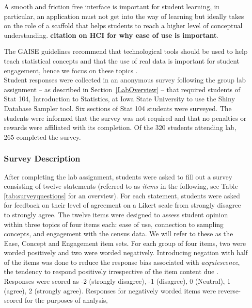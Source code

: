 \documentclass{article}\usepackage[]{graphicx}\usepackage[]{color}
\newcommand{\hh}[1]{{\color{ForestGreen} #1}}
\newcommand{\km}[1]{{\color{Orange} #1}}
\begin{document}
\hh{A smooth and friction free interface is important for student learning, in particular, an application must not get into the way of learning but ideally takes on the role of a scaffold that helps students to reach a higher level of conceptual understanding.}
\km{\textbf{citation on HCI for why ease of use is important}}. 

The GAISE guidelines recommend that technological tools should be used to help teach statistical concepts and that the use of real data is important for student engagement, hence we focus on these topics \citep{GAISEcollege}.  \\

Student responses were collected in an anonymous survey following the group lab assignment -- as described in Section~\ref{LabOverview} -- that required students of Stat 104, Introduction to Statistics, at Iowa State University to use the Shiny Database Sampler tool. Six sections of Stat 104 students were surveyed. The students were informed that the survey was not required and that no penalties or rewards were affiliated with its completion.  Of the 320 students attending lab, 265 completed the survey. 

 \subsubsection{Survey Description} 

After completing the lab assignment, students were asked to fill out a survey consisting of twelve statements (referred to as {\it items} in the following, see Table \ref{tab:surveyquestions} for an overview). For each statement, students were asked for feedback on their level of agreement on a Likert scale from strongly disagree to strongly agree. 
The twelve items were designed to assess student opinion within three topics of four items each: ease of use, connection to sampling concepts, and engagement with the census data.  We will refer to these as the Ease, Concept and Engagement item sets.  For each group of four items, two were worded positively and two were worded negatively. Introducing negation with half of the items was done to reduce the response bias associated with \textit{acquiescence}, the tendency to respond positively irrespective of the item content due \citep{Furnham1986}. Responses were scored as -2 (strongly disagree), -1 (disagree), 0 (Neutral), 1 (agree), 2 (strongly agree).  Responses for negatively worded items were reverse-scored for the purposes of analysis,
\end{document}
